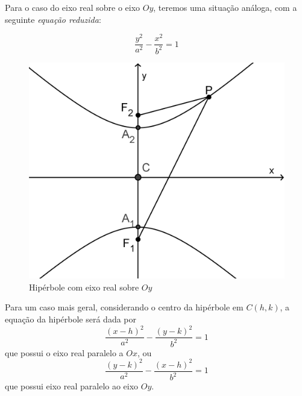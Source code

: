 Para o caso do eixo real sobre o eixo $Oy$, teremos uma situação análoga, com a seguinte \textit{equação reduzida}:

$$\frac{y^2}{a^2}-\frac{x^2}{b^2}=1$$

\begin{figure}[H]
\centering
\includegraphics[width=0.35\linewidth]{analitica/imagens/hiperbolev.png}
\caption{Hipérbole com eixo real sobre $Oy$}
\label{fig:hiperv}
\end{figure}

\vspace{1cm}

Para um caso mais geral, considerando o centro da hipérbole em $C(h, k)$, a equação da hipérbole será dada por $$\frac{\left(x-h\right)^2}{a^2}-\frac{\left(y-k\right)^2}{b^2}=1$$ que possui o eixo real paralelo a $Ox$, ou $$\frac{\left(y-k\right)^2}{a^2}-\frac{\left(x-h\right)^2}{b^2}=1$$ que possui eixo real paralelo ao eixo $Oy$.